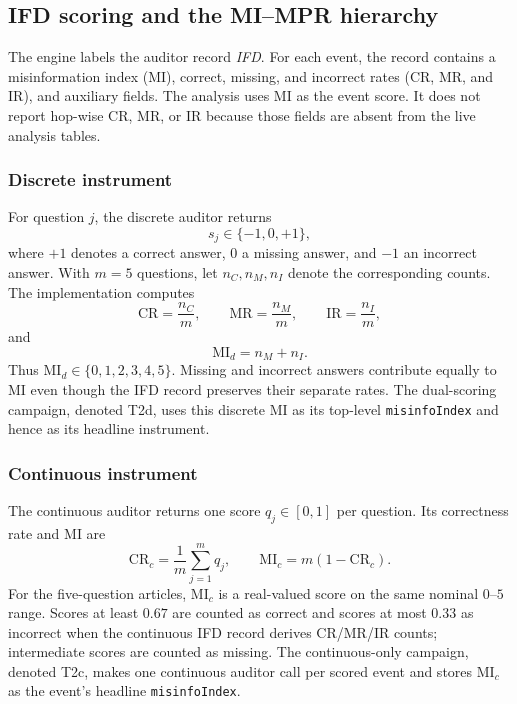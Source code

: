 \subsection{IFD scoring and the MI--MPR hierarchy}
\label{sec:mm-ifd}

The engine labels the auditor record \emph{IFD}.  For each event, the record contains a
misinformation index (MI), correct, missing, and incorrect rates
(\(\mathrm{CR}\), \(\mathrm{MR}\), and \(\mathrm{IR}\)), and auxiliary fields.  The
analysis uses MI as the event score.  It does not report hop-wise CR, MR, or IR because
those fields are absent from the live analysis tables.

\subsubsection{Discrete instrument}
\label{sec:mm-discrete}

For question \(j\), the discrete auditor returns
\[
  s_j\in\{-1,0,+1\},
\]
where \(+1\) denotes a correct answer, \(0\) a missing answer, and \(-1\) an incorrect
answer.  With \(m=5\) questions, let \(n_C,n_M,n_I\) denote the corresponding counts.
The implementation computes
\[
  \mathrm{CR}=\frac{n_C}{m},\qquad
  \mathrm{MR}=\frac{n_M}{m},\qquad
  \mathrm{IR}=\frac{n_I}{m},
\]
and
\begin{equation}
  \mathrm{MI}_{d}=n_M+n_I.
  \label{eq:mi-discrete}
\end{equation}
Thus \(\mathrm{MI}_{d}\in\{0,1,2,3,4,5\}\).  Missing and incorrect answers contribute
equally to MI even though the IFD record preserves their separate rates.  The
dual-scoring campaign, denoted T2d, uses this discrete MI as its top-level
\texttt{misinfoIndex} and hence as its headline instrument.

\subsubsection{Continuous instrument}
\label{sec:mm-continuous}

The continuous auditor returns one score \(q_j\in[0,1]\) per question.  Its correctness
rate and MI are
\begin{equation}
  \mathrm{CR}_{c}=\frac{1}{m}\sum_{j=1}^{m}q_j,
  \qquad
  \mathrm{MI}_{c}=m(1-\mathrm{CR}_{c}).
  \label{eq:mi-continuous}
\end{equation}
For the five-question articles, \(\mathrm{MI}_{c}\) is a real-valued score on the same
nominal \(0\)--\(5\) range.  Scores at least \(0.67\) are counted as correct and scores
at most \(0.33\) as incorrect when the continuous IFD record derives CR/MR/IR counts;
intermediate scores are counted as missing.  The continuous-only campaign, denoted
T2c, makes one continuous auditor call per scored event and stores
\(\mathrm{MI}_{c}\) as the event's headline \texttt{misinfoIndex}.

